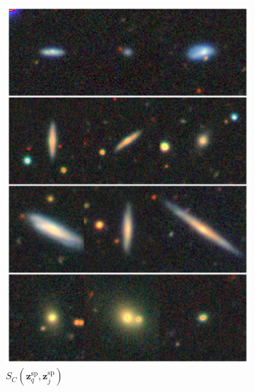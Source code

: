 \documentclass[draft, a4paper,12pt]{article}
\begin{document}
\begin{figure}[H]
\begin{subfigure}{0.22\textwidth}
        \includegraphics[height=0.21\textheight]{../figures/images_sp_sp.png}
        \caption{$S_C(\mathbf{z}_q^{\text{sp}}, \mathbf{z}_j^{\text{sp}})$}
        \label{fig:retrieval_3}
    \end{subfigure}%
    \hfill
    \begin{subfigure}{0.22\textwidth}
        \centering

\end{subfigure}
\end{figure}
\end{document}
